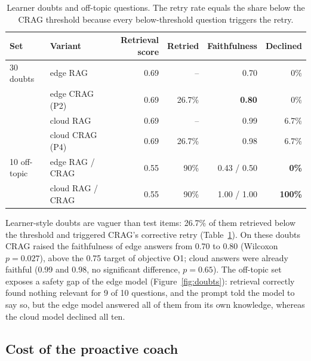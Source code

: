 \begin{table}[htbp]
  \centering
  \caption{Learner doubts and off-topic questions. The retry rate equals the share below the CRAG
    threshold because every below-threshold question triggers the retry.}
  \label{tab:doubts}
  \begin{tabular}{llrrrr}
    \toprule
    Set & Variant & Retrieval score & Retried & Faithfulness & Declined \\
    \midrule
    30 doubts & edge RAG & 0.69 & -- & 0.70 & 0\% \\
              & edge CRAG (P2) & 0.69 & 26.7\% & \textbf{0.80} & 0\% \\
              & cloud RAG & 0.69 & -- & 0.99 & 6.7\% \\
              & cloud CRAG (P4) & 0.69 & 26.7\% & 0.98 & 6.7\% \\
    \midrule
    10 off-topic & edge RAG / CRAG & 0.55 & 90\% & 0.43 / 0.50 & \textbf{0\%} \\
                 & cloud RAG / CRAG & 0.55 & 90\% & 1.00 / 1.00 & \textbf{100\%} \\
    \bottomrule
  \end{tabular}
\end{table}

Learner-style doubts are vaguer than test items: 26.7\% of them retrieved below the threshold and
triggered CRAG's corrective retry (Table~\ref{tab:doubts}). On these doubts CRAG raised the faithfulness
of edge answers from 0.70 to 0.80 (Wilcoxon $p=0.027$), above the 0.75 target of objective O1; cloud
answers were already faithful (0.99 and 0.98, no significant difference, $p=0.65$). The off-topic set
exposes a safety gap of the edge model (Figure~\ref{fig:doubts}): retrieval correctly found nothing
relevant for 9 of 10 questions, and the prompt told the model to say so, but the edge model answered all
of them from its own knowledge, whereas the cloud model declined all ten.

\subsection{Cost of the proactive coach}
\label{sec:res-coach}

